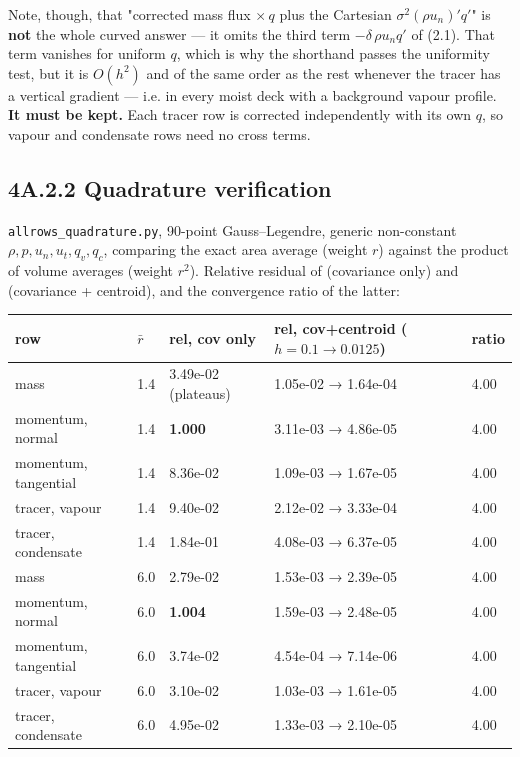 \documentclass[11pt,a4paper]{article}
\begin{document}
Note, though, that "corrected mass flux $\times\,q$ plus the Cartesian
$\sigma^2(\rho u_n)'q'$" is \textbf{not} the whole curved answer — it omits the third
term $-\delta\,\rho u_n q'$ of (2.1). That term vanishes for uniform $q$, which
is why the shorthand passes the uniformity test, but it is $O(h^2)$ and of the
same order as the rest whenever the tracer has a vertical gradient — i.e. in
every moist deck with a background vapour profile. \textbf{It must be kept.} Each
tracer row is corrected independently with its own $q$, so vapour and condensate
rows need no cross terms.

\subsection*{4A.2.2 Quadrature verification}

\texttt{allrows\_quadrature.py}, 90-point Gauss–Legendre, generic non-constant
$\rho,p,u_n,u_t,q_v,q_c$, comparing the exact area average (weight $r$) against
the product of volume averages (weight $r^2$). Relative residual of
(covariance only) and (covariance + centroid), and the convergence ratio of the
latter:

\begin{longtable}{lllll}
\toprule
row & $\bar r$ & rel, cov only & rel, cov+centroid ($h=0.1\to0.0125$) & ratio \\
\midrule
mass & 1.4 & 3.49e-02 (plateaus) & 1.05e-02 → 1.64e-04 & 4.00 \\
momentum, normal & 1.4 & \textbf{1.000} & 3.11e-03 → 4.86e-05 & 4.00 \\
momentum, tangential & 1.4 & 8.36e-02 & 1.09e-03 → 1.67e-05 & 4.00 \\
tracer, vapour & 1.4 & 9.40e-02 & 2.12e-02 → 3.33e-04 & 4.00 \\
tracer, condensate & 1.4 & 1.84e-01 & 4.08e-03 → 6.37e-05 & 4.00 \\
mass & 6.0 & 2.79e-02 & 1.53e-03 → 2.39e-05 & 4.00 \\
momentum, normal & 6.0 & \textbf{1.004} & 1.59e-03 → 2.48e-05 & 4.00 \\
momentum, tangential & 6.0 & 3.74e-02 & 4.54e-04 → 7.14e-06 & 4.00 \\
tracer, vapour & 6.0 & 3.10e-02 & 1.03e-03 → 1.61e-05 & 4.00 \\
tracer, condensate & 6.0 & 4.95e-02 & 1.33e-03 → 2.10e-05 & 4.00 \\
\bottomrule
\end{longtable}
\end{document}
